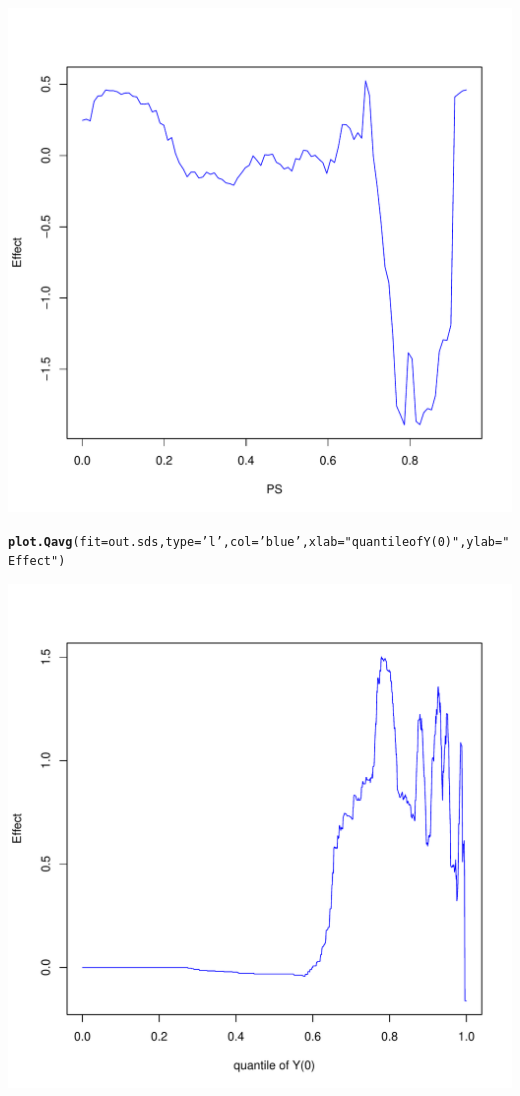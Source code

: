 \documentclass{article}\usepackage[]{graphicx}\usepackage[]{color}
\makeatletter
\def\maxwidth{ %
  \ifdim\Gin@nat@width>\linewidth
    \linewidth
  \else
    \Gin@nat@width
  \fi
}
\newcommand{\hlstr}[1]{\textcolor[rgb]{0.192,0.494,0.8}{#1}}%
\newcommand{\hlstd}[1]{\textcolor[rgb]{0.345,0.345,0.345}{#1}}%
\newcommand{\hlkwc}[1]{\textcolor[rgb]{0.333,0.667,0.333}{#1}}%
\newcommand{\hlkwd}[1]{\textcolor[rgb]{0.737,0.353,0.396}{\textbf{#1}}}%
\newenvironment{kframe}{%
 \def\at@end@of@kframe{}%
 \ifinner\ifhmode%
  \def\at@end@of@kframe{\end{minipage}}%
  \begin{minipage}{\columnwidth}%
 \fi\fi%
 \def\FrameCommand##1{\hskip\@totalleftmargin \hskip-\fboxsep
 \colorbox{shadecolor}{##1}\hskip-\fboxsep
     \hskip-\linewidth \hskip-\@totalleftmargin \hskip\columnwidth}%
 \MakeFramed {\advance\hsize-\width
   \@totalleftmargin\z@ \linewidth\hsize
   \@setminipage}}%
 {\par\unskip\endMakeFramed%
 \at@end@of@kframe}
\newenvironment{knitrout}{}{} %
\makeatother
\begin{document}
\begin{knitrout}
{\centering \includegraphics[width=\maxwidth]{figures/SDS-heatmap-2} 

}


\begin{kframe}\begin{alltt}
\hlkwd{plot.Qavg}\hlstd{(}\hlkwc{fit}\hlstd{=out.sds  ,} \hlkwc{type}\hlstd{=}\hlstr{'l'} \hlstd{,} \hlkwc{col}\hlstd{=}\hlstr{'blue'} \hlstd{,} \hlkwc{xlab}\hlstd{=}\hlstr{"quantile of Y(0)"} \hlstd{,} \hlkwc{ylab}\hlstd{=}\hlstr{"Effect"}\hlstd{)}
\end{alltt}
\end{kframe}

{\centering \includegraphics[width=\maxwidth]{figures/SDS-heatmap-3} 

}



\end{knitrout}
\end{document}
